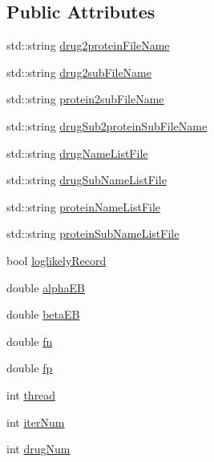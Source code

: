 \subsection*{Public Attributes}
\begin{DoxyCompactItemize}
\item 
std\+::string \hyperlink{classgift_1_1parameters_a61fc22423e89322e853c5eecebee3808}{drug2protein\+File\+Name}
\item 
std\+::string \hyperlink{classgift_1_1parameters_aa27081bc09725a965312c44ea26e4ba8}{drug2sub\+File\+Name}
\item 
std\+::string \hyperlink{classgift_1_1parameters_a2c450bde4fa0d68a858ce1007d2202c0}{protein2sub\+File\+Name}
\item 
std\+::string \hyperlink{classgift_1_1parameters_a9a245f231438683010d85aa618bd6bd4}{drug\+Sub2protein\+Sub\+File\+Name}
\item 
std\+::string \hyperlink{classgift_1_1parameters_ad7f26adc041d62b07fa99385565f51a1}{drug\+Name\+List\+File}
\item 
std\+::string \hyperlink{classgift_1_1parameters_a9bc090c30495e569533f32198d5d92ae}{drug\+Sub\+Name\+List\+File}
\item 
std\+::string \hyperlink{classgift_1_1parameters_aaa3fbb7fb15202e1c87b3e93ce5b5e03}{protein\+Name\+List\+File}
\item 
std\+::string \hyperlink{classgift_1_1parameters_a24da583f5d710acc0db17a6e712adcdd}{protein\+Sub\+Name\+List\+File}
\item 
bool \hyperlink{classgift_1_1parameters_a685b9b92d640eb6806a481623b2baf40}{loglikely\+Record}
\item 
double \hyperlink{classgift_1_1parameters_adbe3588acaf5006d064586809ffa3d28}{alpha\+EB}
\item 
double \hyperlink{classgift_1_1parameters_a5c4260c7b30043ee69799d31d3a2a78e}{beta\+EB}
\item 
double \hyperlink{classgift_1_1parameters_a013c5a70224e76299291635dd1378c95}{fn}
\item 
double \hyperlink{classgift_1_1parameters_ada8450efdd6cac84464deee710c130c3}{fp}
\item 
int \hyperlink{classgift_1_1parameters_a0af23934a569abd605e9521df0a049ce}{thread}
\item 
int \hyperlink{classgift_1_1parameters_af6c28fdac7f38e09583f4545a0bf022d}{iter\+Num}
\item 
int \hyperlink{classgift_1_1parameters_a207a63e1ef9ef9b9d802c452029e27fa}{drug\+Num}
\item 

\end{DoxyCompactItemize}
